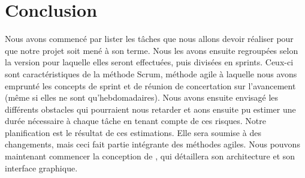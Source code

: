\section{Conclusion}
	\label{sec:conclusion}

	Nous avons commencé par lister les tâches que nous allons devoir réaliser pour que notre projet soit mené à son terme. Nous les avons ensuite regroupées selon la version pour laquelle elles seront effectuées, puis divisées en sprints. Ceux-ci sont caractéristiques de la méthode Scrum, méthode agile à laquelle nous avons emprunté les concepts de sprint et de réunion de concertation sur l'avancement (même si elles ne sont qu'hebdomadaires). Nous avons ensuite envisagé les différents obstacles qui pourraient nous retarder et aons ensuite pu estimer une durée nécessaire à chaque tâche en tenant compte de ces risques. Notre planification est le résultat de ces estimations. Elle sera soumise à des changements, mais ceci fait partie intégrante des méthodes agiles. Nous pouvons maintenant commencer la conception de \glasir{}, qui détaillera son architecture et son interface graphique.